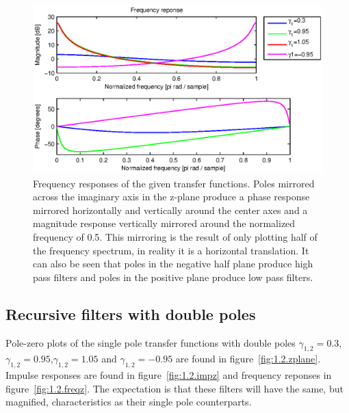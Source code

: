 \begin{figure}
	\center
	\includegraphics{./picture/ha6_1_1_freqz.eps}
	\caption{Frequency responses of the given transfer functions. Poles mirrored across the imaginary axis in the z-plane produce a phase response mirrored horizontally and vertically around the center axes and a magnitude response vertically mirrored around the normalized frequency of 0.5. This mirroring is the result of only plotting half of the frequency spectrum, in reality it is a horizontal translation. It can also be seen that poles in the negative half plane produce high pass filters and poles in the positive plane produce low pass filters. }
	\label{fig:1.1.freqz}
\end{figure}

\subsection{Recursive filters with double poles\\}
Pole-zero plots of the single pole transfer functions with double poles \(\gamma_{1,2}=0.3\),\(\gamma_{1,2}=0.95\),\(\gamma_{1,2}=1.05\) and \(\gamma_{1,2}=-0.95\) are found in figure~\ref{fig:1.2.zplane}.
Impulse responses are found in figure~\ref{fig:1.2.impz} and frequency reponses in figure~\ref{fig:1.2.freqz}.
The expectation is that these filters will have the same, but magnified, characteristics as their single pole counterparts.

